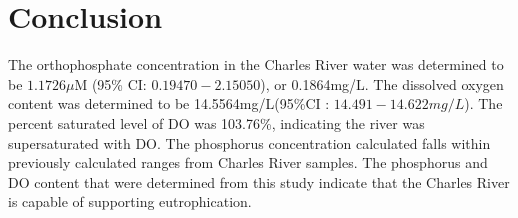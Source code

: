 \section{Conclusion}
The orthophosphate concentration in the Charles River water was determined to be $1.1726\mu $M (95\% CI: $0.19470 - 2.15050$), or 0.1864mg/L. The dissolved oxygen content was determined to be 14.5564mg/L(95\%CI : $14.491 - 14.622mg/L$). The percent saturated level of DO was 103.76\%, indicating the river was supersaturated with DO. The phosphorus concentration calculated falls within previously calculated ranges from Charles River samples. The phosphorus and DO content that were determined from this study indicate that the Charles River is capable of supporting eutrophication.








